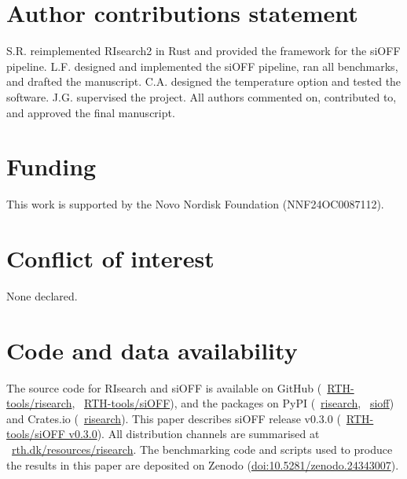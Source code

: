 \documentclass[unnumsec,webpdf,contemporary,large]{oup-authoring-template}
\begin{document}
\section{Author contributions statement}
S.R. reimplemented RIsearch2 in Rust and provided the framework for the siOFF pipeline.
L.F. designed and implemented the siOFF pipeline, ran all benchmarks, and drafted the manuscript.
C.A. designed the temperature option and tested the software.
J.G. supervised the project.
All authors commented on, contributed to, and approved the final manuscript.

\section{Funding}
This work is supported by the Novo Nordisk Foundation (NNF24OC0087112).

\section{Conflict of interest}
None declared.

\section{Code and data availability}
The source code for RIsearch and siOFF is available on GitHub (\faGithub~\href{https://github.com/RTH-tools/risearch}{RTH-tools/risearch}, \faGithub~\href{https://github.com/RTH-tools/siOFF}{RTH-tools/siOFF}), and the packages on PyPI (\faPython~\href{https://pypi.org/project/risearch/}{risearch}, \faPython~\href{https://pypi.org/project/sioff/}{sioff}) and Crates.io (\faRust~\href{https://crates.io/crates/risearch}{risearch}).
This paper describes siOFF release v0.3.0 (\faGithub~\href{https://github.com/RTH-tools/siOFF/releases/tag/v0.3.0}{RTH-tools/siOFF v0.3.0}).
All distribution channels are summarised at \faGlobe~\href{http://rth.dk/resources/risearch/}{rth.dk/resources/risearch}.
The benchmarking code and scripts used to produce the results in this paper are deposited on Zenodo (\href{https://doi.org/10.5281/zenodo.24343007}{doi:10.5281/zenodo.24343007}).




\end{document}
